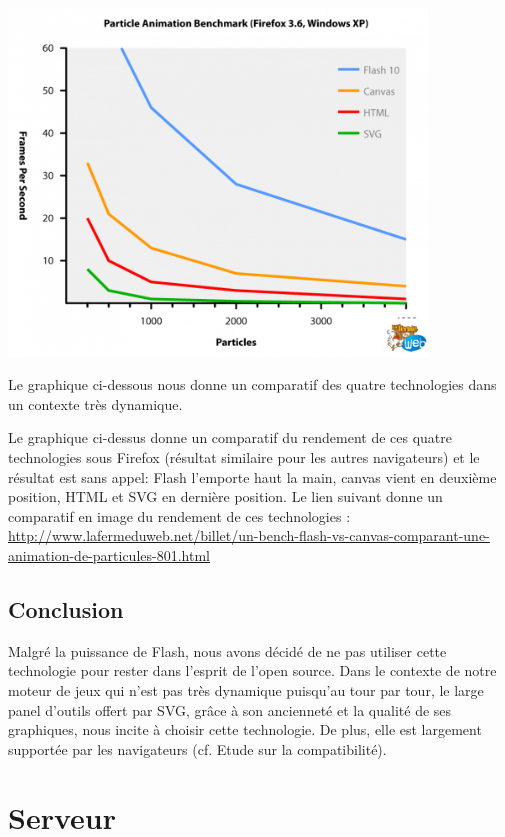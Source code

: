\documentclass[a4paper,10pt]{report}
\begin{document}
  \includegraphics[width=420px]{img/bench.png}

  Le graphique ci-dessous nous donne un comparatif des quatre technologies dans 
un contexte très dynamique.
 
Le graphique ci-dessus donne un comparatif du rendement de ces quatre technologies sous 
Firefox (résultat similaire pour les autres navigateurs) et le résultat est sans appel: 
Flash l'emporte haut la main, canvas vient en deuxième position, HTML et SVG en dernière 
position. Le lien suivant donne un comparatif en image du rendement de ces technologies : \url{http://www.lafermeduweb.net/billet/un-bench-flash-vs-canvas-comparant-une-animation-de-particules-801.html}

\section{Conclusion}
Malgré la puissance de Flash, nous avons décidé de ne pas utiliser cette 
technologie pour rester dans l'esprit de l'open source.
Dans le contexte de notre moteur de jeux qui n'est pas très dynamique puisqu'au tour par tour, le large panel 
d'outils offert par SVG, grâce à son ancienneté et la qualité de ses graphiques,
 nous incite à choisir cette technologie. De plus, elle est largement supportée par les navigateurs
 (cf. Etude sur la compatibilité).



\chapter{Serveur}
\end{document}
